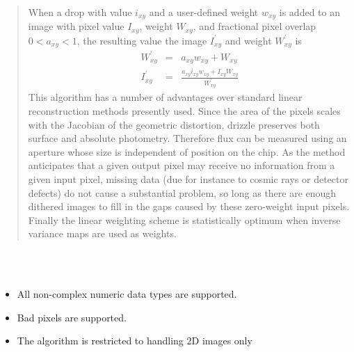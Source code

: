 \documentclass[twoside,11pt]{article}
\renewcommand{\_}{\texttt{\symbol{95}}}
\newcommand{\sstimplementationstatus}[1]{
   \item[{Implementation Status:}] \mbox{} \\[1.3ex] #1}
\newcommand{\sstitemlist}[1]{
  \mbox{} \\
  \vspace{-3.5ex}
  \begin{itemize}
     #1
  \end{itemize}
}
\newcommand{\sstitem}{\item}
\newcommand{\sstimplementationstatus}[1]{
      \item[Implementation Status:] #1
   }
\newcommand{\sstitemlist}[1]{
      \begin{itemize}
         #1
      \end{itemize}
      \\
   }
\newcommand{\sstitem}{\item}
\begin{document}
{{\begin{quotation}
       When a drop with value $i_{xy}$ and a user-defined weight $w_{xy}$
       is added to an image with pixel value $I_{xy}$, weight $W_{xy}$, and
       fractional pixel overlap $0 < a_{xy} < 1$, the resulting value
       the image $I^{\prime}_{xy}$ and weight $W^{\prime}_{xy}$ is
       \begin{eqnarray*}
              W^{\prime}_{xy} & = & a_{xy}w_{xy} + W_{xy}  \\
              I^{\prime}_{xy} & = & \frac{a_{xy}i_{xy}w_{xy} + I_{xy}W_{xy}}{
                                    W^{\prime}_{xy} }
       \end{eqnarray*}
       This algorithm has a number of advantages over standard linear
       reconstruction methods presently used. Since the area of the pixels
       scales with the Jacobian of the geometric distortion, drizzle
       preserves both surface and absolute photometry. Therefore flux can
       be measured using an aperture whose size is independent of position
       on the chip. As the method anticipates that a given output pixel may
       receive no information from a given input pixel, missing data (due
       for instance to cosmic rays or detector defects) do not cause a
       substantial problem, so long as there are enough dithered images to
       fill in the gaps caused by these zero-weight input pixels. Finally
       the linear weighting scheme is statistically optimum when inverse
       variance maps are used as weights.
      \end{quotation}
   }
   \sstimplementationstatus{
      \sstitemlist{

         \sstitem
         All non-complex numeric data types are supported.

         \sstitem
         Bad pixels are supported.

         \sstitem
         The algorithm is restricted to handling 2D images only
      }
   }
}
\end{document}
